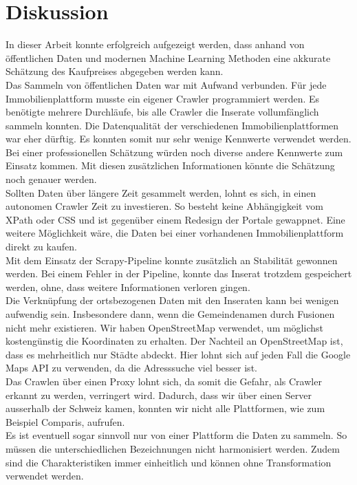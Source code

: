 \section{Diskussion}
In dieser Arbeit konnte erfolgreich aufgezeigt werden, dass anhand von öffentlichen Daten und modernen Machine Learning Methoden eine akkurate Schätzung des Kaufpreises abgegeben werden kann.\\[2ex]
%
Das Sammeln von öffentlichen Daten war mit Aufwand verbunden. Für jede Immobilienplattform musste ein eigener Crawler programmiert werden. Es benötigte mehrere Durchläufe, bis alle Crawler die Inserate vollumfänglich sammeln konnten. Die Datenqualität der verschiedenen Immobilienplattformen war eher dürftig. Es konnten somit nur sehr wenige Kennwerte verwendet werden. Bei einer professionellen Schätzung würden noch diverse andere Kennwerte zum Einsatz kommen. Mit diesen zusätzlichen Informationen könnte die Schätzung noch genauer werden.\\
Sollten Daten über längere Zeit gesammelt werden, lohnt es sich, in einen autonomen Crawler Zeit zu investieren. So besteht keine Abhängigkeit vom XPath oder CSS und ist gegenüber einem Redesign der Portale gewappnet. Eine weitere Möglichkeit wäre, die Daten bei einer vorhandenen Immobilienplattform direkt zu kaufen.\\
Mit dem Einsatz der Scrapy-Pipeline konnte zusätzlich an Stabilität gewonnen werden. Bei einem Fehler in der Pipeline, konnte das Inserat trotzdem gespeichert werden, ohne, dass weitere Informationen verloren gingen.\\
%
Die Verknüpfung der ortsbezogenen Daten mit den Inseraten kann bei wenigen aufwendig sein. Insbesondere dann, wenn die Gemeindenamen durch Fusionen nicht mehr existieren. Wir haben OpenStreetMap verwendet, um möglichst kostengünstig die Koordinaten zu erhalten. Der Nachteil an OpenStreetMap ist, dass es mehrheitlich nur Städte abdeckt. Hier lohnt sich auf jeden Fall die Google Maps API zu verwenden, da die Adresssuche viel besser ist.\\[2ex]
%
Das Crawlen über einen Proxy lohnt sich, da somit die Gefahr, als Crawler erkannt zu werden, verringert wird. Dadurch, dass wir über einen Server ausserhalb der Schweiz kamen, konnten wir nicht alle Plattformen, wie zum Beispiel Comparis, aufrufen.\\
Es ist eventuell sogar sinnvoll nur von einer Plattform die Daten zu sammeln. So müssen die unterschiedlichen Bezeichnungen nicht harmonisiert werden. Zudem sind die Charakteristiken immer einheitlich und können ohne Transformation verwendet werden.

